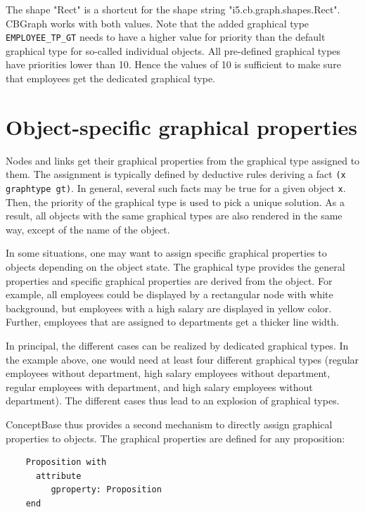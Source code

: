 The shape "Rect" is a shortcut for the shape string "i5.cb.graph.shapes.Rect". CBGraph 
works with both values.
Note that the added graphical type {\tt EMPLOYEE\_TP\_GT} needs to have a higher value
for priority than the default graphical type for so-called individual objects. All pre-defined
graphical types have priorities lower than 10. Hence the values of 10 is sufficient to 
make sure that employees get the dedicated graphical type. 


\section{Object-specific graphical properties}
\label{gproperty}

Nodes and links get their graphical properties from the graphical type assigned to them.
The assignment is typically defined by deductive rules deriving a fact {\tt (x graphtype gt)}. 
In general, several such facts may be true for a given object {\tt x}. Then, the priority
of the graphical type is used to pick a unique solution. As a result, all objects with
the same graphical types are also rendered in the same way, except of the name of the object.

In some situations, one may want to assign specific graphical properties to objects depending on
the object state. The graphical type provides the general properties and specific graphical properties
are derived from the object. For example, all employees could be displayed by a rectangular node with
white background, but employees with a high salary are displayed in yellow color. Further,
employees that are assigned to departments get a thicker line width. 

In principal, the different cases can be realized by dedicated graphical types. In the example above,
one would need at least four different graphical types (regular employees without department,
high salary employees without department, regular employees with department, and
high salary employees without department). The different cases thus lead to an explosion of graphical
types.

ConceptBase thus provides a second mechanism to directly assign graphical properties to objects.
The graphical properties are defined for any proposition:

{\small
\begin{verbatim}
    Proposition with
      attribute 
         gproperty: Proposition
    end
\end{verbatim}
}


